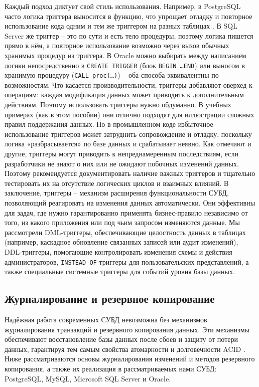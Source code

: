 Каждый подход диктует свой стиль использования. Например, в PostgreSQL часто логика триггера выносится в функцию, что упрощает отладку и повторное использование кода одним и тем же триггером на разных таблицах \autocite{Postgresqltrig}. 
В SQL Server же триггер – это по сути и есть тело процедуры, поэтому логика пишется прямо в нём, а повторное использование возможно через вызов обычных хранимых процедур из триггера. 
В Oracle можно выбирать между написанием логики непосредственно в \texttt{CREATE TRIGGER} (блок \texttt{BEGIN \ldots END}) или выносом в хранимую процедуру (\texttt{CALL proc(\ldots)}) \autocite{oracledbdoc7} – оба способа эквивалентны по возможностям.
Что касается производительности, триггеры добавляют оверхед к операциям: каждая модификация данных может приводить к дополнительным действиям. Поэтому использовать триггеры нужно обдуманно. В учебных примерах (как в этом пособии) они отлично подходят для иллюстрации сложных правил поддержания данных. Но в промышленном коде избыточное использование триггеров может затруднить сопровождение и отладку, поскольку логика «разбрасывается» по базе данных и срабатывает неявно. Как отмечают \autocite{Silberschatz} и другие, триггеры могут приводить к непреднамеренным последствиям, если разработчики не знают о них или не ожидают побочных изменений данных. Поэтому рекомендуется документировать наличие важных триггеров и тщательно тестировать их на отсутствие логических циклов и взаимных влияний.
В заключение, триггеры – механизм расширения функциональности СУБД, позволяющий реагировать на изменения данных автоматически. Они эффективны для задач, где нужно гарантированно применять бизнес-правило независимо от того, из какого приложения или под чьим запросом изменяются данные. Мы рассмотрели DML-триггеры, обеспечивающие целостность данных в таблицах (например, каскадное обновление связанных записей или аудит изменений), DDL-триггеры, помогающие контролировать изменения схемы и действия администраторов, \texttt{INSTEAD OF}-триггеры для пользовательских представлений, а также специальные системные триггеры для событий уровня базы данных. 

\subsection{Журналирование и резервное копирование} 

 Надёжная работа современных СУБД невозможна без механизмов журналирования транзакций и резервного копирования данных. Эти механизмы обеспечивают восстановление базы данных после сбоев и защиту от потери данных, гарантируя тем самым свойства атомарности и долговечности ACID \autocite{Silberschatz}. Ниже рассматриваются основы журналирования изменений и методов резервного копирования, а также их реализация в рассматриваемых нами СУБД: PostgreSQL, MySQL, Microsoft SQL Server и Oracle. 
 
